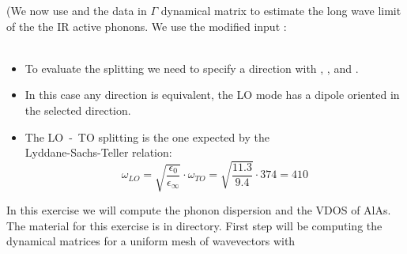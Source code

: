 \documentclass[landscape]{foils}
\begin{document}
(\small We now use  and the data in $\Gamma$ dynamical matrix to  estimate
the long wave limit of the the IR active phonons. We use the modified input :\\[0.5em]
\\[3.5em]
\parbox{13cm}{\small
	\begin{itemize}
		\item To evaluate the splitting we need to specify a direction with 
			, , and . 
		\item  In this case any direction is equivalent, the LO mode has a dipole oriented in the 
			selected direction. 
		\item  The LO~-~TO splitting is the one expected by the \\ Lyddane-Sachs-Teller relation: 
			$$ \omega_{LO} = \sqrt{\frac{\epsilon_0}{\epsilon_{\infty}}} \cdot \omega_{TO} = \sqrt{\frac{11.3}{9.4}}\cdot 374 = 410 $$ 
	\end{itemize}
	}
\hskip 2cm 
\parbox{10cm}{
}
In this exercise we will compute the phonon dispersion and the VDOS of AlAs. 
The material for this exercise is in  directory. 
First step will be computing the dynamical matrices for a uniform mesh of wavevectors with 
\end{document}
